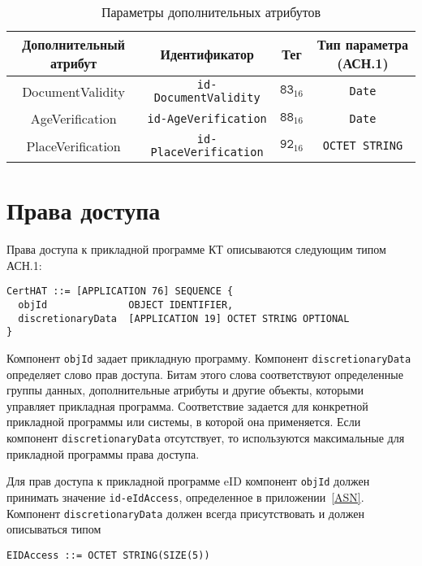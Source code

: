 \begin{table}[h!]
\caption{Параметры дополнительных атрибутов}\label{Table.DATA.Optional}
\begin{tabular}{|c|c|c|c|}
\hline
Дополнительный атрибут & Идентификатор & Тег & Тип параметра (АСН.1)\\
\hline
\hline
DocumentValidity  &	\verb|id-DocumentValidity| & $\texttt{83}_{16}$ & 
\verb|Date|\\
\hline                                                
AgeVerification	  & \verb|id-AgeVerification| & $\texttt{88}_{16}$ & 
\verb|Date|\\
\hline                                                
PlaceVerification &	\verb|id-PlaceVerification| & $\texttt{92}_{16}$ & 
\verb|OCTET STRING|\\
\hline
\end{tabular}
\end{table}

\section{Права доступа}\label{DATA.Access}

Права доступа к прикладной программе КТ описываются следующим типом АСН.1: 

\begin{verbatim}
CertHAT ::= [APPLICATION 76] SEQUENCE {
  objId              OBJECT IDENTIFIER,
  discretionaryData  [APPLICATION 19] OCTET STRING OPTIONAL
}
\end{verbatim}

Компонент \verb|objId| задает прикладную программу. 
Компонент \verb|discretionaryData| определяет слово прав доступа. 
Битам этого слова соответствуют определенные группы данных, 
дополнительные атрибуты и другие объекты, 
которыми управляет прикладная программа. Соответствие задается для 
конкретной прикладной программы или системы, в которой она применяется. 
Если компонент \verb|discretionaryData| отсутствует, 
то используются максимальные для прикладной программы права доступа. 

Для прав доступа к прикладной программе eID компонент \verb|objId| должен принимать 
значение \verb|id-eIdAccess|, определенное в приложении~\ref{ASN}. 
Компонент \verb|discretionaryData| должен всегда присутствовать и 
должен описываться типом  

\begin{verbatim}
EIDAccess ::= OCTET STRING(SIZE(5))
\end{verbatim}

